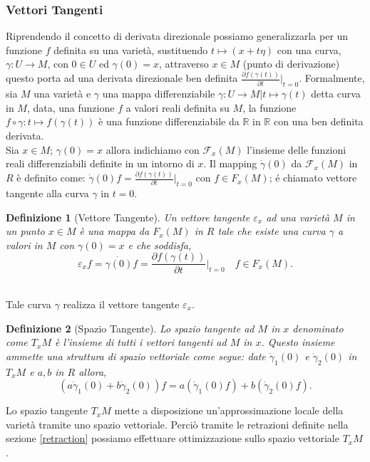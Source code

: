 \documentclass[a4paper, 12pt]{article}
\newtheorem{definition}{Definizione}
\begin{document}
\subsubsection{Vettori Tangenti}
Riprendendo il concetto di derivata direzionale possiamo generalizzarla per un funzione $f$ definita su una varietà, sustituendo $t \mapsto (x + t\eta)$ con una curva, $\gamma: U \to M$, con $0 \in U$ ed $\gamma (0) = x$, attraverso $x \in M$ (punto di derivazione) questo porta ad una derivata direzionale ben definita $\frac{\partial f(\gamma (t))}{\partial t} \vert_{t=0}$. Formalmente, sia $M$ una varietà e $\gamma$ una mappa differenziabile $\gamma : U \to M | t \mapsto \gamma (t)$ detta curva in $M$, data, una funzione $f$ a valori reali definita su $M$, la funzione $f \circ \gamma : t \mapsto f(\gamma (t))$ è una funzione differenziabile da $\mathbb{R}$ in $\mathbb{R}$ con una ben definita derivata.\\
Sia $x \in M$; $\gamma (0) = x$ allora indichiamo con $\mathcal{F}_{x}(M)$ l'insieme delle funzioni reali differenziabili definite in un intorno di $x$. Il mapping $\dot{\gamma} (0)$ da $\mathcal{F}_x(M)$ in $R$ è definito come: $\dot{\gamma} (0) f = \frac{\partial f(\gamma (t))}{\partial t} \vert_{t=0}$ con $f \in F_x(M)$; é chiamato vettore tangente alla curva $\gamma$ in $t=0$.
\begin{definition}[Vettore Tangente]
Un vettore tangente $\varepsilon_x$ ad una varietà $M$ in un punto $x \in M$ è una mappa da $F_x(M)$ in $R$ tale che esiste una curva $\gamma$ a valori in $M$ con $\gamma (0) = x$ e che soddisfa,\\
\[\varepsilon_xf = \dot{\gamma (0)} f = \frac{\partial f(\gamma (t))}{\partial t} \vert_{t=0} \quad  f \in F_x(M).\]\\
\end{definition}
Tale curva $\gamma$ realizza il vettore tangente $\varepsilon_x$.
\begin{definition}[Spazio Tangente]
Lo spazio tangente ad $M$ in $x$ denominato come $T_xM$ è l'insieme di tutti i vettori tangenti ad $M$ in $x$. Questo insieme ammette una struttura di spazio vettoriale come segue: date $\dot{\gamma}_1 (0)$ e $\dot{\gamma}_2 (0)$ in $T_xM$ e $a, b$ in $R$ allora,\\
\[(a \dot{\gamma}_1 (0) + b \dot{\gamma}_2 (0)) f = a (\dot{\gamma}_1 (0) f) + b (\dot{\gamma}_2 (0) f).\]
\end{definition}
Lo spazio tangente $T_xM$ mette a disposizione un'approssimazione locale della varietà tramite uno spazio vettoriale. Perciò tramite le retrazioni definite nella sezione \ref{retraction} possiamo effettuare ottimizzazione sullo spazio vettoriale $T_xM$.
\end{document}

